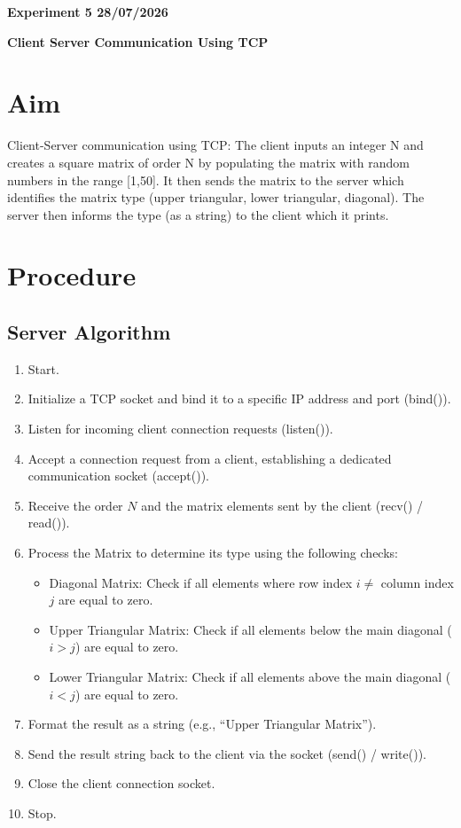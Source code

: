 \documentclass[12pt, a4paper]{report}
\begin{document}
\newpage 
\begin{center}
	\bfseries 
	Experiment 5 \hfill 28/07/2026
\end{center}
\label{exp:5}
\begin{center}
	{\bfseries \Huge Client Server Communication Using TCP \par}
\end{center}

\section*{Aim}
Client-Server communication using TCP: The client inputs an integer N and creates a
square matrix of order N by populating the matrix with random numbers in the range
[1,50]. It then sends the matrix to the server which identifies the matrix type (upper
triangular, lower triangular, diagonal). The server then informs the type (as a string) to the
client which it prints.

\section*{Procedure}
\subsection*{Server Algorithm}
\begin{enumerate}
	\itemsep 0em
	\item Start.
	\item Initialize a TCP socket and bind it to a specific IP address and port (bind()).
	\item Listen for incoming client connection requests (listen()).
	\item Accept a connection request from a client, establishing a dedicated communication socket (accept()).
	\item Receive the order $N$ and the matrix elements sent by the client (recv() / read()).
	\item Process the Matrix to determine its type using the following checks:
	\begin{itemize}
		\item Diagonal Matrix: Check if all elements where row index $i \neq$ column index $j$ are equal to zero.
		\item Upper Triangular Matrix: Check if all elements below the main diagonal ($i > j$) are equal to zero.
		\item Lower Triangular Matrix: Check if all elements above the main diagonal ($i < j$) are equal to zero.
	\end{itemize}
	\item Format the result as a string (e.g., ``Upper Triangular Matrix'').
	\item Send the result string back to the client via the socket (send() / write()).
	\item Close the client connection socket.
	\item Stop.
\end{enumerate}
\end{document}
